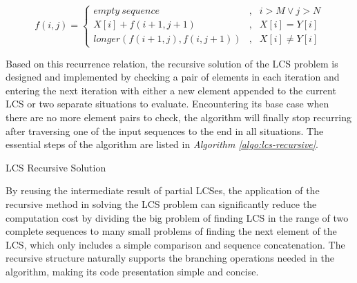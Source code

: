 \documentclass[sigplan,screen]{acmart}
\begin{document}
\begin{equation}
    \label{eq:lcs-recursive}
    f(i, j) = \left \{
    \begin{aligned}
        empty\ sequence &, & i > M \vee j > N \\
        X[i] + f(i+1, j+1) &, & X[i] = Y[i] \\
        longer(f(i+1, j), f(i, j+1)) &, & X[i] \neq Y[i]
    \end{aligned}
    \right.
\end{equation}

Based on this recurrence relation, the recursive solution of the LCS problem is designed and implemented by checking a pair of elements in each iteration and entering the next iteration with either a new element appended to the current LCS or two separate situations to evaluate. Encountering its base case when there are no more element pairs to check, the algorithm will finally stop recurring after traversing one of the input sequences to the end in all situations. The essential steps of the algorithm are listed in \textit{Algorithm \ref{algo:lcs-recursive}}.

\begin{algorithm}
    \caption{LCS Recursive Solution}
    \label{algo:lcs-recursive}
\end{algorithm}

By reusing the intermediate result of partial LCSes, the application of the recursive method in solving the LCS problem can significantly reduce the computation cost by dividing the big problem of finding LCS in the range of two complete sequences to many small problems of finding the next element of the LCS, which only includes a simple comparison and sequence concatenation. The recursive structure naturally supports the branching operations needed in the algorithm, making its code presentation simple and concise.
\end{document}
